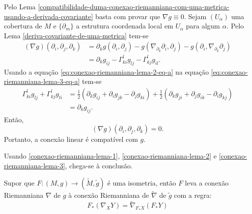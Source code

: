 \begin{demonstracao}
	Pelo Lema \ref{compatibilidade-duma-conexao-riemanniana-com-uma-metrica-usando-a-derivada-covariante} basta com provar que $\nabla g \equiv 0$.
	Sejam 
	$(U_{\alpha})$ uma cobertura de $M$ e 
	$\{ \partial_m \}$ a estrutura coordenada local em $U_{\alpha}$ para algum $\alpha$.
	Pelo Lema \ref{deriva-covariante-de-uma-metrica} tem-se
	\begin{equation}\label{eq:conexao-riemanniana-lema-3-eq-a}
		\begin{split}
			(\nabla g) (\partial_i, \partial_j, \partial_k) &= \partial_k g(\partial_i, \partial_j) - g(\nabla_{\partial_k} \partial_i, \partial_j) - g(\partial_i, \nabla_{\partial_k} \partial_j)\\
			&= \partial_k g_{ij} - \Gamma_{ki}^l g_{lj} - \Gamma_{kj}^l g_{il}.
		\end{split}	
	\end{equation}
	Usando a equação \eqref{eq:conexao-riemanniana-lema-2-eq-a} na equação \eqref{eq:conexao-riemanniana-lema-3-eq-a} tem-se
	\begin{align*}
	\Gamma_{ki}^l g_{lj} + \Gamma_{kj}^l g_{li} &= \frac{1}{2} (\partial_k g_{ij} + \partial_i g_{jk} - \partial_j g_{ki}) + \frac{1}{2} (\partial_k g_{ji} + \partial_j g_{ik} - \partial_i g_{kj})\\
	&= \partial_k g_{ij}.
	\end{align*}
	Então,
	\begin{equation*}
	(\nabla g) (\partial_i, \partial_j, \partial_k) = 0.
	\end{equation*}
	Portanto, a conexão linear é compatível com $g$.
\end{demonstracao}

\begin{demonstracao}
	Usando \ref{conexao-riemanniana-lema-1}, \ref{conexao-riemanniana-lema-2} e \ref{conexao-riemanniana-lema-3}, chega-se à conclusão.
\end{demonstracao}

\begin{proposicao}
	Supor que $F: (M,g) \rightarrow (\tilde{M}, \tilde{g})$ é uma isometria, então $F$ leva a conexão Riemanniana $\nabla$ de $g$ à conexão Riemanniana de $\tilde{\nabla}$ de $\tilde{g}$ com a regra:
	\begin{equation*}
		F_* (\nabla_X Y) = \tilde{\nabla}_{F_* X} (F_* Y)
	\end{equation*}
\end{proposicao}

